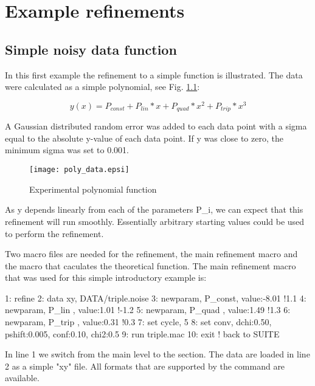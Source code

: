 
\chapter{Example refinements \label{exa}}
\section{Simple noisy data function \label{exa-simple}}

In this first example the refinement to a simple function is
illustrated. The data were calculated as a simple polynomial,
see Fig. \ref{fexa-poly-exp}:

\begin{equation}
  y(x) = P_{const} + P_{lin}*x + P_{quad}*x^2 + P_{trip}*x^3
\end{equation}

A Gaussian distributed random error was added to each data point 
with a sigma equal to the absolute y-value of each data point.
If y was close to zero, the minimum sigma was set to 0.001.

\begin{figure}
   \texttt{[image: poly\_data.epsi]}
   \caption{Experimental polynomial function}
   \label{fexa-poly-exp}
\end{figure}

As y depends linearly from each of the parameters P\_{i}, we can expect
that this refinement will run smoothly. Essentially arbitrary starting values
could be used to perform the refinement.

Two macro files are needed for the refinement, the main refinement macro and the
macro that caculates the theoretical function. The main refinement macro that
was used for this simple introductory example is:

\begin{MacVerbatim}
 1: refine
 2: data xy, DATA/triple.noise
 3: newparam, P_const, value:-8.01 !1.1
 4: newparam, P_lin  , value:1.01  !-1.2
 5: newparam, P_quad , value:1.49  !1.3
 6: newparam, P_trip , value:0.31 !0.3
 7: set  cycle,   5
 8: set conv, dchi:0.50, pshift:0.005, conf:0.10, chi2:0.5
 9: run triple.mac
10: exit   ! back to SUITE
\end{MacVerbatim}

In line 1 we switch from the main \Suite level to the \Refine section. 
The data are loaded in line 2 as a simple "xy" file. All formats that
are supported by the  command are available. 
  

